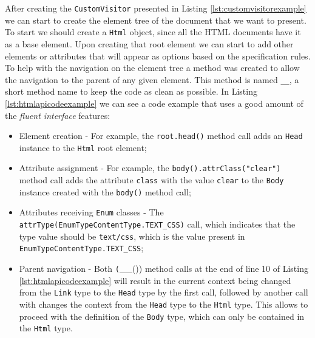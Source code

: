\newpage

\noindent
After creating the \texttt{CustomVisitor} presented in Listing \ref{lst:customvisitorexample} we can start to create the element tree of the document that we want to present. To start we should create a \texttt{Html} object, since all the \ac{HTML} documents have it as a base element. Upon creating that root element we can start to add other elements or attributes that will appear as options based on the specification rules. To help with the navigation on the element tree a method was created to allow the navigation to the parent of any given element. This method is named \texttt{\_\_}, a short method name to keep the code as clean as possible. In Listing \ref{lst:htmlapicodeexample} we can see a code example that uses a good amount of the \textit{fluent interface} features:

\begin{itemize}
	\item Element creation - For example, the \texttt{root.head()} method call adds an \texttt{Head} instance to the \texttt{Html} root element;
	\item Attribute assignment - For example, the \texttt{body().attrClass("clear")} method call adds the attribute \texttt{class} with the value \texttt{clear} to the \texttt{Body} instance created with the \texttt{body()} method call;
	\item Attributes receiving \texttt{Enum} classes - The \texttt{attrType(EnumTypeContentType.TEXT\_CSS)} call, which indicates that the type value should be \texttt{text/css}, which is the value present in \texttt{EnumTypeContentType.TEXT\_CSS};
	\item Parent navigation - Both \texttt(\_\_()) method calls at the end of line 10 of Listing \ref{lst:htmlapicodeexample} will result in the current context being changed from the \texttt{Link} type to the \texttt{Head} type by the first call, followed by another call with changes the context from the \texttt{Head} type to the \texttt{Html} type. This allows to proceed with the definition of the \texttt{Body} type, which can only be contained in the \texttt{Html} type.
\end{itemize}

\bigskip
{}

